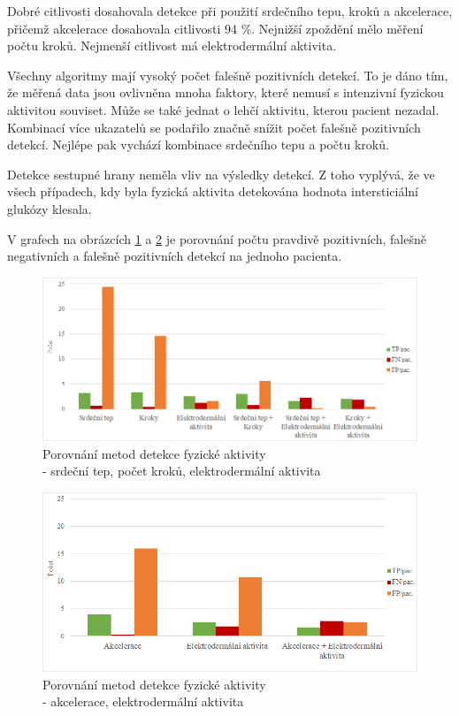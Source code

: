 Dobré citlivosti dosahovala detekce při použití srdečního tepu, kroků a akcelerace, přičemž akcelerace dosahovala citlivosti 94 \%. Nejnižší zpoždění mělo měření počtu kroků. Nejmenší citlivost má elektrodermální aktivita.

Všechny algoritmy mají vysoký počet falešně pozitivních detekcí. To je dáno tím, že měřená data jsou ovlivněna mnoha faktory, které nemusí s intenzivní fyzickou aktivitou souviset. Může se také jednat o lehčí aktivitu, kterou pacient nezadal. Kombinací více ukazatelů se podařilo značně snížit počet falešně pozitivních detekcí. Nejlépe pak vychází kombinace srdečního tepu a počtu kroků.

Detekce sestupné hrany neměla vliv na výsledky detekcí. Z toho vyplývá, že ve všech případech, kdy byla fyzická aktivita detekována hodnota intersticiální glukózy klesala.

V grafech na obrázcích \ref{fig:res_heart} a \ref{fig:res_acc} je porovnání počtu pravdivě pozitivních, falešně negativních a falešně pozitivních detekcí  na jednoho pacienta.

\begin{figure}[H]
\caption{Porovnání metod detekce fyzické aktivity\\ - srdeční tep, počet kroků, elektrodermální aktivita}
\label{fig:res_heart}
\includegraphics[width=1\textwidth]{img/vysledky/pa/g1.png}
\end{figure}

\begin{figure}[H]
\caption{Porovnání metod detekce fyzické aktivity\\ - akcelerace, elektrodermální aktivita}
\label{fig:res_acc}
\includegraphics[width=1\textwidth]{img/vysledky/pa/g2.png}
\end{figure}